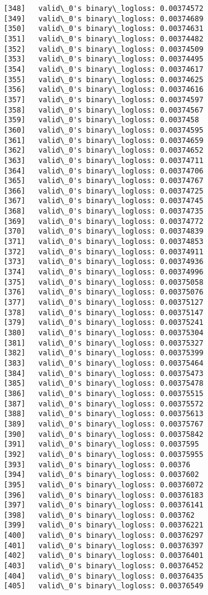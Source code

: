 \documentclass[11pt]{article}
\begin{document}
\begin{Verbatim}[commandchars=\\\{\}]
[348]	valid\_0's binary\_logloss: 0.00374572
[349]	valid\_0's binary\_logloss: 0.00374689
[350]	valid\_0's binary\_logloss: 0.00374631
[351]	valid\_0's binary\_logloss: 0.00374482
[352]	valid\_0's binary\_logloss: 0.00374509
[353]	valid\_0's binary\_logloss: 0.00374495
[354]	valid\_0's binary\_logloss: 0.00374617
[355]	valid\_0's binary\_logloss: 0.00374625
[356]	valid\_0's binary\_logloss: 0.00374616
[357]	valid\_0's binary\_logloss: 0.00374597
[358]	valid\_0's binary\_logloss: 0.00374567
[359]	valid\_0's binary\_logloss: 0.0037458
[360]	valid\_0's binary\_logloss: 0.00374595
[361]	valid\_0's binary\_logloss: 0.00374659
[362]	valid\_0's binary\_logloss: 0.00374652
[363]	valid\_0's binary\_logloss: 0.00374711
[364]	valid\_0's binary\_logloss: 0.00374706
[365]	valid\_0's binary\_logloss: 0.00374767
[366]	valid\_0's binary\_logloss: 0.00374725
[367]	valid\_0's binary\_logloss: 0.00374745
[368]	valid\_0's binary\_logloss: 0.00374735
[369]	valid\_0's binary\_logloss: 0.00374772
[370]	valid\_0's binary\_logloss: 0.00374839
[371]	valid\_0's binary\_logloss: 0.00374853
[372]	valid\_0's binary\_logloss: 0.00374911
[373]	valid\_0's binary\_logloss: 0.00374936
[374]	valid\_0's binary\_logloss: 0.00374996
[375]	valid\_0's binary\_logloss: 0.00375058
[376]	valid\_0's binary\_logloss: 0.00375076
[377]	valid\_0's binary\_logloss: 0.00375127
[378]	valid\_0's binary\_logloss: 0.00375147
[379]	valid\_0's binary\_logloss: 0.00375241
[380]	valid\_0's binary\_logloss: 0.00375304
[381]	valid\_0's binary\_logloss: 0.00375327
[382]	valid\_0's binary\_logloss: 0.00375399
[383]	valid\_0's binary\_logloss: 0.00375464
[384]	valid\_0's binary\_logloss: 0.00375473
[385]	valid\_0's binary\_logloss: 0.00375478
[386]	valid\_0's binary\_logloss: 0.00375515
[387]	valid\_0's binary\_logloss: 0.00375572
[388]	valid\_0's binary\_logloss: 0.00375613
[389]	valid\_0's binary\_logloss: 0.00375767
[390]	valid\_0's binary\_logloss: 0.00375842
[391]	valid\_0's binary\_logloss: 0.0037595
[392]	valid\_0's binary\_logloss: 0.00375955
[393]	valid\_0's binary\_logloss: 0.00376
[394]	valid\_0's binary\_logloss: 0.0037602
[395]	valid\_0's binary\_logloss: 0.00376072
[396]	valid\_0's binary\_logloss: 0.00376183
[397]	valid\_0's binary\_logloss: 0.00376141
[398]	valid\_0's binary\_logloss: 0.003762
[399]	valid\_0's binary\_logloss: 0.00376221
[400]	valid\_0's binary\_logloss: 0.00376297
[401]	valid\_0's binary\_logloss: 0.00376397
[402]	valid\_0's binary\_logloss: 0.00376401
[403]	valid\_0's binary\_logloss: 0.00376452
[404]	valid\_0's binary\_logloss: 0.00376435
[405]	valid\_0's binary\_logloss: 0.00376549

\end{Verbatim}
\end{document}
